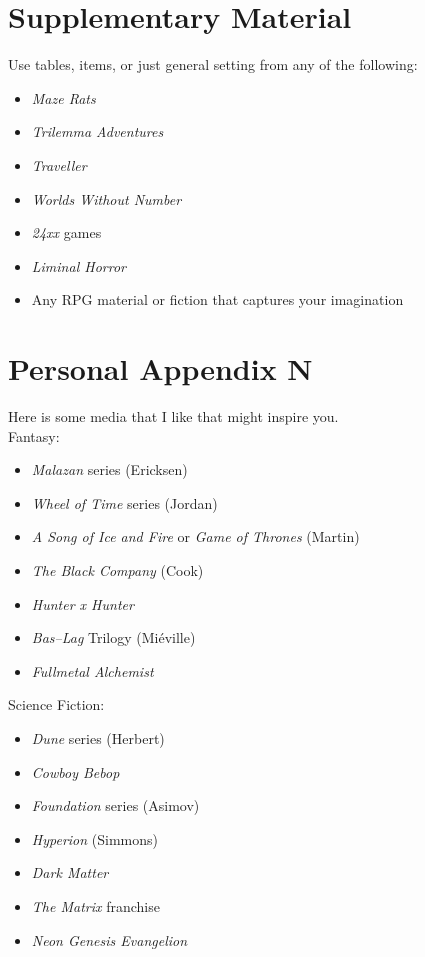 \documentclass[landscape]{book}
\begin{document}
\begin{multicols*}{4}
\section*{Supplementary Material}

Use tables, items, or just general setting from any of the following:

\begin{itemize}
\item \emph{Maze Rats}
\item \emph{Trilemma Adventures}
\item \emph{Traveller}
\item \emph{Worlds Without Number}
\item \emph{24xx} games
\item \emph{Liminal Horror}
\item Any RPG material or fiction that captures your imagination
\end{itemize}

\section*{Personal Appendix N}

Here is some media that I like that might inspire you.\\

Fantasy:
\begin{itemize}
\item \emph{Malazan} series (Ericksen)
\item \emph{Wheel of Time} series (Jordan)
\item \emph{A Song of Ice and Fire} or \emph{Game of Thrones} (Martin)
\item \emph{The Black Company} (Cook)
\item \emph{Hunter x Hunter}
\item \emph{Bas--Lag} Trilogy (Mi\'eville)
\item \emph{Fullmetal Alchemist}
\end{itemize}

Science Fiction:
\begin{itemize}
\item \emph{Dune} series (Herbert)
\item \emph{Cowboy Bebop}
\item \emph{Foundation} series (Asimov)
\item \emph{Hyperion} (Simmons)
\item \emph{Dark Matter}
\item \emph{The Matrix} franchise
\item \emph{Neon Genesis Evangelion}
\end{itemize}


\end{multicols*}
\end{document}
